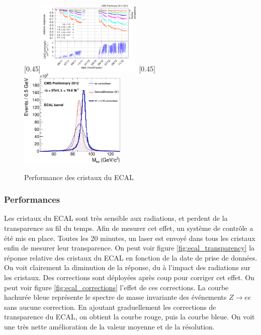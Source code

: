 \begin{figure}[t] \centering
  [0.45\textwidth]{\includegraphics[width=0.45\textwidth]{chapitre2/figs/ecal_transparency.png}} \hfill
  [0.45\textwidth]{\includegraphics[width=0.45\textwidth]{chapitre2/figs/ecal_corrections_effect.pdf}}
  \caption{Performance des cristaux du ECAL}
  \label{fig:ecal_performance}
\end{figure}

\subsubsection{Performances}

Les cristaux du ECAL sont très sensible aux radiations, et perdent de la transparence au fil du temps. Afin de mesurer cet effet, un système de contrôle a été mis en place. Toutes les 20 minutes, un laser est envoyé dans tous les cristaux enfin de mesurer leur transparence. On peut voir figure \ref{fig:ecal_transparency} la réponse relative des cristaux du ECAL en fonction de la date de prise de données. On voit clairement la diminution de la réponse, du à l'impact des radiations sur les cristaux. Des corrections sont déployées après coup pour corriger cet effet. On peut voir figure \ref{fig:ecal_corrections} l'effet de ces corrections. La courbe hachurée bleue représente le spectre de masse invariante des événements $Z \rightarrow ee$ sans aucune correction. En ajoutant graduellement les corrections de transparence du ECAL, on obtient la courbe rouge, puis la courbe bleue. On voit une très nette amélioration de la valeur moyenne et de la résolution.

